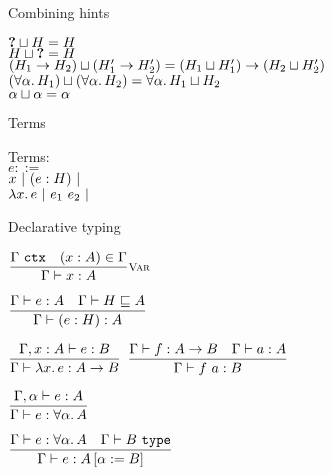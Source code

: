 \documentclass{beamer}
\begin{document}
\begin{frame}{Combining hints}

\begin{center}
  $\textbf{?} \sqcup H = H$ \\
  $H \sqcup \textbf{?} = H$ \\
  $(H_1 \to H_2) \sqcup (H'_1 \to H'_2) = (H_1 \sqcup H'_1) \to (H_2 \sqcup H'_2)$ \\
  $(\forall \alpha.\, H_1) \sqcup (\forall \alpha.\, H_2) = \forall \alpha.\, H_1 \sqcup H_2$ \\
  $\alpha \sqcup \alpha = \alpha$
\end{center}

\end{frame}

\begin{frame}{Terms}

Terms: \\
$e ::=$ \\
\qquad $x \ |\  (e : H) \ |\  $ \\
\qquad $\fun{x}{e} \pipe \app{e_1}{e_2} \pipe$

\end{frame}

\begin{frame}{Declarative typing}

\begin{center}
  $\infrule[Var]{\ctx{\Gamma} \quad \sidecond{(x : A) \in \Gamma}}{\typing{x}{A}}$

  \vspace{2em}

  $\infrule{\typing{e}{A} \quad \sidecond{\hintorderinctx{H}{A}}}{\typing{\annot{e}{H}}{A}}$

  \vspace{2em}

  $\infrule{\typing[\extend{\Gamma}{x}{A}]{e}{B}}{\typing{\fun{x}{e}}{\Fun{A}{B}}}$ \quad
  $\infrule{\typing{f}{\Fun{A}{B}} \quad \typing{a}{A}}{\typing{\app{f}{a}}{B}}$

  \vspace{2em}

  $\infrule{\typing[\extendtype{\Gamma}{\alpha}]{e}{A}}{\typing{e}{\ForallT{\alpha}{A}}}$

  \vspace{2em}

  $\infrule{\typing{e}{\ForallT{\alpha}{A}} \quad \type{B}}{\typing{e}{\subst{A}{\alpha}{B}}}$
\end{center}

\end{frame}
\end{document}
